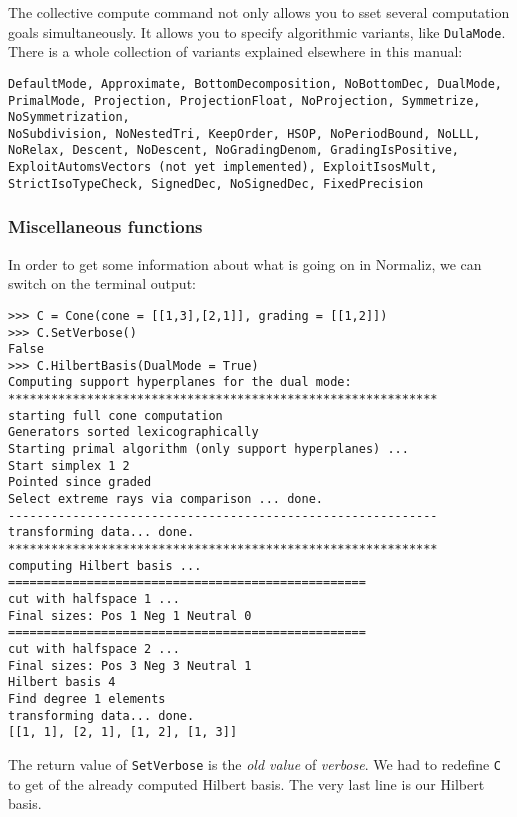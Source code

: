 \documentclass[12pt,a4paper]{scrartcl}
\theoremstyle{definition}
\def\ttt{\texttt}
\begin{document}
\begin{small}
The collective compute command not only allows you to sset several computation goals simultaneously. It allows you to specify algorithmic variants, like \verb|DulaMode|. There is a whole collection of variants explained elsewhere in this manual:

\ttt{DefaultMode,
Approximate,
BottomDecomposition,
NoBottomDec,
DualMode,\\
PrimalMode,
Projection,
ProjectionFloat,
NoProjection,
Symmetrize,
NoSymmetrization,\\
NoSubdivision,
NoNestedTri, 
KeepOrder,
HSOP,
NoPeriodBound,
NoLLL,
NoRelax,
Descent,
NoDescent,
NoGradingDenom,
GradingIsPositive,
ExploitAutomsVectors (not yet implemented),
ExploitIsosMult,
StrictIsoTypeCheck,
SignedDec,
NoSignedDec,
FixedPrecision}

\subsubsection{Miscellaneous functions}
In order to get some information about what is going on in Normaliz, we can switch on the terminal output:
\begin{Verbatim}
>>> C = Cone(cone = [[1,3],[2,1]], grading = [[1,2]])
>>> C.SetVerbose()
False
>>> C.HilbertBasis(DualMode = True)
Computing support hyperplanes for the dual mode:
************************************************************
starting full cone computation
Generators sorted lexicographically
Starting primal algorithm (only support hyperplanes) ...
Start simplex 1 2 
Pointed since graded
Select extreme rays via comparison ... done.
------------------------------------------------------------
transforming data... done.
************************************************************
computing Hilbert basis ...
==================================================
cut with halfspace 1 ...
Final sizes: Pos 1 Neg 1 Neutral 0
==================================================
cut with halfspace 2 ...
Final sizes: Pos 3 Neg 3 Neutral 1
Hilbert basis 4
Find degree 1 elements
transforming data... done.
[[1, 1], [2, 1], [1, 2], [1, 3]]
\end{Verbatim}
The return value of \verb|SetVerbose| is the \emph{old value} of \emph{verbose}. We had to redefine \verb|C| to get of the already computed Hilbert basis. The very last line is our Hilbert basis.


\end{small}
\end{document}
